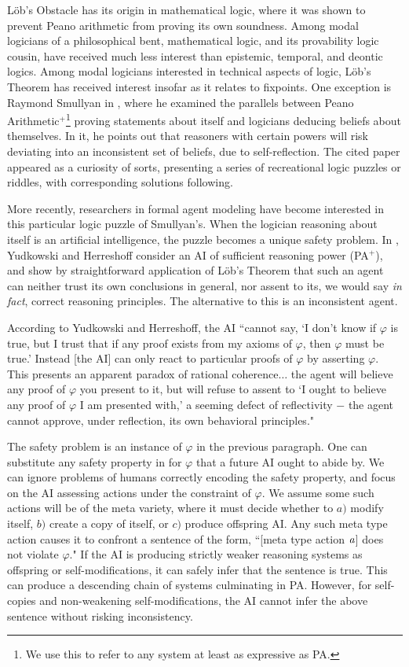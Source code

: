 L\"ob's Obstacle has its origin in mathematical logic, where it was shown to prevent Peano arithmetic from proving its own soundness. Among modal logicians of a philosophical bent, mathematical logic, and its provability logic cousin, have received much less interest than epistemic, temporal, and deontic logics. Among modal logicians interested in technical aspects of logic, L\"ob's Theorem has received interest insofar as it relates to fixpoints. One exception is Raymond Smullyan in \cite{smullyan}, where he examined the parallels between Peano Arithmetic$^+$\footnote{We use this to refer to any system at least as expressive as PA.} proving statements about itself and logicians deducing beliefs about themselves. In it, he points out that reasoners with certain powers will risk deviating into an inconsistent set of beliefs, due to self-reflection. The cited paper appeared as a curiosity of sorts, presenting a series of recreational logic puzzles or riddles, with corresponding solutions following. 

More recently, researchers in formal agent modeling have become interested in this particular logic puzzle of Smullyan's. When the logician reasoning about itself is an artificial intelligence, the puzzle becomes a unique safety problem. In \cite{yudkowski}, Yudkowski and Herreshoff consider an AI of sufficient reasoning power (PA$^+$), and show by straightforward application of L\"ob's Theorem that such an agent can neither trust its own conclusions in general, nor assent to its, we would say \emph{in fact}, correct reasoning principles. The alternative to this is an inconsistent agent.

According to Yudkowski and Herreshoff, the AI ``cannot say, `I don’t know if $\varphi$ is true, but I trust that if any proof exists from my axioms of $\varphi$, then $\varphi$ must be true.' Instead [the AI] can only react to particular proofs of $\varphi$ by asserting $\varphi$. This presents an apparent paradox of rational coherence$\dots$ the agent will believe any proof of $\varphi$ you present to it, but will refuse to assent to `I ought to believe any proof of $\varphi$ I am presented with,' a seeming defect of reflectivity $-$ the agent cannot approve, under reflection, its own behavioral principles." 

The safety problem is an instance of $\varphi$ in the previous paragraph. One can substitute any safety property in for $\varphi$ that a future AI ought to abide by. We can ignore problems of humans correctly encoding the safety property, and focus on the AI assessing actions under the constraint of $\varphi$. We assume some such actions will be of the meta variety, where it must decide whether to $a)$ modify itself, $b)$ create a copy of itself, or $c)$ produce offspring AI. Any such meta type action causes it to confront a sentence of the form, ``[meta type action $\mathit{a}$] does not violate $\varphi$." If the AI is producing strictly weaker reasoning systems as offspring or self-modifications, it can safely infer that the sentence is true\cite{yudkowski}. This can produce a descending chain of systems culminating in PA. However, for self-copies and non-weakening self-modifications, the AI cannot infer the above sentence without risking inconsistency.

